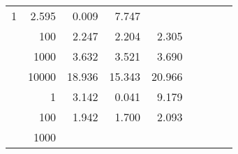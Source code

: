 \begin{table}
\begin{tabular}{rrrrrrrrr}
					\multirow{ 1 }{*}{ 1 } &
					
						
							    
							    
	                           2.595 & 0.009 & 7.747  \\
	                
	            
					 &  
					 
					\multirow{ 1 }{*}{ 100 } &
					
						
							    
							    
	                           2.247 & 2.204 & 2.305  \\
	                
	            
					 &  
					 
					\multirow{ 1 }{*}{ 1000 } &
					
						
							    
							    
	                           3.632 & 3.521 & 3.690  \\
	                
	            
					 &  
					 
					\multirow{ 1 }{*}{ 10000 } &
					
						
							    
							    
	                           18.936 & 15.343 & 20.966  \\
	                
	            
	        
				\noalign{\smallskip}\hline
				\multirow{ 4 }{*}{ 160000 } &
				
					
					 
					\multirow{ 1 }{*}{ 1 } &
					
						
							    
							    
	                           3.142 & 0.041 & 9.179  \\
	                
	            
					 &  
					 
					\multirow{ 1 }{*}{ 100 } &
					
						
							    
							    
	                           1.942 & 1.700 & 2.093  \\
	                
	            
					 &  
					 
					\multirow{ 1 }{*}{ 1000 } &
					
						
							    

\end{tabular}
\end{table}
